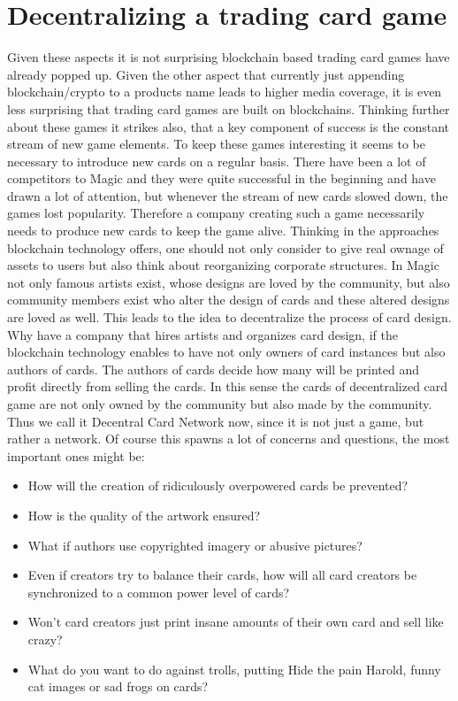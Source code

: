 \documentclass{article}
\begin{document}
\section{Decentralizing a trading card game}
%
Given these aspects it is not surprising blockchain based trading card games have already popped up. Given the other aspect that currently just appending blockchain/crypto to a products name leads to higher media coverage, it is even less surprising that trading card games are built on blockchains. Thinking further about these games it strikes also, that a key component of success is the constant stream of new game elements. To keep these games interesting it seems to be necessary to introduce new cards on a regular basis. There have been a lot of competitors to Magic and they were quite successful in the beginning and have drawn a lot of attention, but whenever the stream of new cards slowed down, the games lost popularity. Therefore a company creating such a game necessarily needs to produce new cards to keep the game alive. Thinking in the approaches blockchain technology offers, one should not only consider to give real ownage of assets to users but also think about reorganizing corporate structures. In Magic not only famous artists exist, whose designs are loved by the community, but also community members exist who alter the design of cards and these altered designs are loved as well. This leads to the idea to decentralize the process of card design. Why have a company that hires artists and organizes card design, if the blockchain technology enables to have not only owners of card instances but also authors of cards. The authors of cards decide how many will be printed and profit directly from selling the cards. In this sense the cards of decentralized card game are not only owned by the community but also made by the community. Thus we call it Decentral Card Network now, since it is not just a game, but rather a network. Of course this spawns a lot of concerns and questions, the most important ones might be:
%
\begin{itemize}
	\item How will the creation of ridiculously overpowered cards be prevented?
	\item How is the quality of the artwork ensured?
	\item What if authors use copyrighted imagery or abusive pictures?
	\item Even if creators try to balance their cards, how will all card creators be synchronized to a common power level of cards?
	\item Won't card creators just print insane amounts of their own card and sell like crazy?
	\item What do you want to do against trolls, putting Hide the pain Harold, funny cat images or sad frogs on cards?
\end{itemize}
\end{document}
